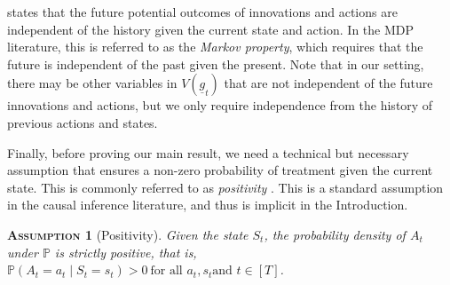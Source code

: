 \documentclass[12pt,a4paper]{article}
\newtheorem{assumption}{\normalfont\scshape Assumption}
\theoremstyle{definition}
\newcommand{\PP}[0]{\mathbb{P}}
\DeclareMathOperator{\gG}{\mathscr{G}}
\begin{document}
 states that the
future potential outcomes of innovations and actions are independent
of the history given the current state and action. In the MDP
literature, this is referred to as the \emph{Markov property}, which
requires that the future is independent of the past given the
present. Note that in our setting, there may be other variables in
$V(\underline{g}_t)$ that are not
independent of the future innovations and actions, but we only require
independence from the history of previous actions and
states. %

Finally, before proving our main result, we need a technical but
necessary assumption that ensures a non-zero probability of treatment
given the current state. This is commonly referred to as
\emph{positivity} \parencite{hernan_causal_nodate}. This is a standard
assumption in the causal inference literature, and thus is
implicit in the Introduction. %
\begin{assumption}[Positivity]\label{assump:positivity}
  Given the state $S_t$, the probability density of $A_t$
  under $\PP$ is strictly positive, that is,
  $
    \PP(A_{t} = a_t \mid S_{t} = s_t) > 0 ~ \text{for all $a_t, s_t$
      and $t \in [T]$}
   $.
\end{assumption}
\end{document}
